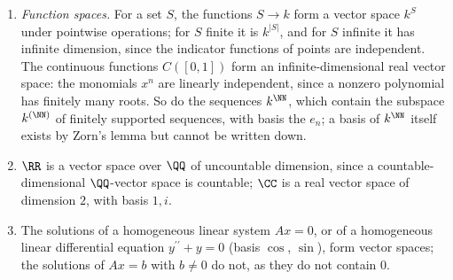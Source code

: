 \begin{example}
\begin{enumerate}
The polynomials of degree at most $d$, together with $0$, form a subspace $k[x]_{\leq d}$, as the coefficients of $f + g$ and $cf$ in degrees above $d$ vanish when those of $f$ and $g$ do. The same argument shows that
$1, x, \ldots, x^d$ is a basis of it, so $\dim k[x]_{\leq d} = d + 1$. Here is a second basis. For distinct $a_0, \ldots, a_d \in k$, the \emph{Lagrange polynomials}
\[
L_i = \prod_{j \neq i}\frac{x - a_j}{a_i - a_j}, \qquad i = 0, \ldots, d,
\]
have degree $d$ and satisfy $L_i(a_l) = 1$ if $l = i$ and $L_i(a_l) = 0$ if $l \neq i$: for $l \neq i$ the factor with $j = l$ vanishes at $a_l$, and at $a_i$ every factor equals $1$. They are independent: evaluating
$\sum_ic_iL_i = 0$ at $a_l$ gives $c_l = 0$. They span: for $p \in k[x]_{\leq d}$, the polynomial $q = p - \sum_ip(a_i)L_i$ lies in $k[x]_{\leq d}$ and vanishes at the $d + 1$ points $a_0, \ldots, a_d$, so $q = 0$, as a
nonzero polynomial of degree at most $d$ has at most $d$ roots (Corollary~\ref{rings:corollary-roots}). So $p = \sum_ip(a_i)L_i$: the coordinates of $p$ in this basis are its values $p(a_i)$. Equivalently
(\emph{Lagrange interpolation}), for any $b_0, \ldots, b_d \in k$ there is exactly one polynomial of degree at most $d$ with $p(a_i) = b_i$ for all $i$, namely $\sum_ib_iL_i$. For instance, through the points $(0, 1)$,
$(1, 3)$, $(2, 7)$ passes exactly one polynomial of degree at most $2$, namely $\frac12(x - 1)(x - 2) - 3x(x - 2) + \frac72x(x - 1) = x^2 + x + 1$.
\item \emph{Function spaces.} For a set $S$, the functions $S \to k$ form a vector space $k^S$ under pointwise operations; for $S$ finite it is $k^{|S|}$, and for $S$ infinite it has infinite
dimension, since the indicator functions of points are independent. The continuous functions $C([0, 1])$ form an infinite-dimensional real vector space: the monomials $x^n$ are linearly
independent, since a nonzero polynomial has finitely many roots. So do the sequences $k^{\NN}$, which contain the subspace $k^{(\NN)}$ of finitely supported sequences, with basis the $e_n$;
a basis of $k^{\NN}$ itself exists by Zorn's lemma but cannot be written down.
\item $\RR$ is a vector space over $\QQ$ of uncountable dimension, since a countable-dimensional $\QQ$-vector space is countable; $\CC$ is a real vector space of dimension $2$, with basis $1, i$.
\item The solutions of a homogeneous linear system $Ax = 0$, or of a homogeneous linear differential equation $y^{\prime\prime} + y = 0$ (basis $\cos$, $\sin$), form vector spaces; the solutions of
$Ax = b$ with $b \neq 0$ do not, as they do not contain $0$.
\end{enumerate}
\end{example}

